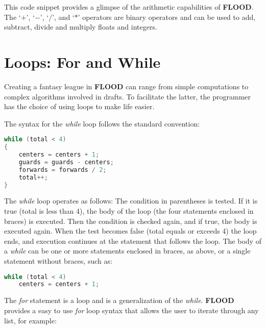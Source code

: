 \documentclass[12pt]{report}
\begin{document}
\begin{doublespace}
This code snippet provides a glimpse of the arithmetic capabilities of \textbf{FLOOD}. The `$+$', `$-$', `$/$', and `$*$' operators are binary operators and can be used to add, subtract, divide and multiply floats and integers.
\end{doublespace}

\section{Loops: For and While}

\begin{doublespace}
Creating a fantasy league in \textbf{FLOOD} can range from simple computations to complex algorithms involved in drafts. To facilitate the latter, the programmer has the choice of using loops to make life easier.

The syntax for the \textit{while} loop follows the standard convention:
\end{doublespace}

\begin{lstlisting}[language=Java,label=some-code,caption=While loop]
while (total < 4)
{
	centers = centers + 1;
	guards = guards - centers;
	forwards = forwards / 2;
	total++;
}
\end{lstlisting}

\begin{doublespace}
The \textit{while} loop operates as follows: The condition in parentheses is tested. If it is true (total is less than 4), the body of the loop (the four statements enclosed in braces) is executed. Then the condition is checked again, and if true, the body is executed again. When the test becomes false (total equals or exceeds 4) the loop ends, and execution continues at the statement that follows the loop. The body of a \textit{while} can be one or more statements enclosed in braces, as above, or a single statement without braces, such as:
\end{doublespace}

\begin{lstlisting}[language=Java,label=some-code,caption=Single statement while loop]
while (total < 4)
	centers = centers + 1;
\end{lstlisting}

\begin{doublespace}
The \textit{for} statement is a loop and is a generalization of the \textit{while}. \textbf{FLOOD} provides a easy to use \textit{for} loop syntax that allows the user to iterate through any list, for example:
\end{doublespace}
\end{document}
